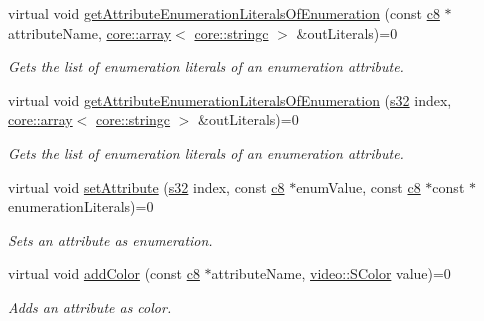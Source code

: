 \begin{DoxyCompactItemize}
virtual void \hyperlink{classirr_1_1io_1_1IAttributes_a74980af4d5297b74670f55711e25fd79}{get\+Attribute\+Enumeration\+Literals\+Of\+Enumeration} (const \hyperlink{namespaceirr_a9395eaea339bcb546b319e9c96bf7410}{c8} $\ast$attribute\+Name, \hyperlink{classirr_1_1core_1_1array}{core\+::array}$<$ \hyperlink{namespaceirr_1_1core_ab26a0e0359206b5a694f35c37c829d7f}{core\+::stringc} $>$ \&out\+Literals)=0
\begin{DoxyCompactList}\small\item\em Gets the list of enumeration literals of an enumeration attribute. \end{DoxyCompactList}\item 
virtual void \hyperlink{classirr_1_1io_1_1IAttributes_ae5d5d0c42a5a0199baf12abe971cb610}{get\+Attribute\+Enumeration\+Literals\+Of\+Enumeration} (\hyperlink{namespaceirr_ac66849b7a6ed16e30ebede579f9b47c6}{s32} index, \hyperlink{classirr_1_1core_1_1array}{core\+::array}$<$ \hyperlink{namespaceirr_1_1core_ab26a0e0359206b5a694f35c37c829d7f}{core\+::stringc} $>$ \&out\+Literals)=0
\begin{DoxyCompactList}\small\item\em Gets the list of enumeration literals of an enumeration attribute. \end{DoxyCompactList}\item 
\mbox{\label{classirr_1_1io_1_1IAttributes_a90962800fc16f01aa90e88a83188449b}} 
virtual void \hyperlink{classirr_1_1io_1_1IAttributes_a90962800fc16f01aa90e88a83188449b}{set\+Attribute} (\hyperlink{namespaceirr_ac66849b7a6ed16e30ebede579f9b47c6}{s32} index, const \hyperlink{namespaceirr_a9395eaea339bcb546b319e9c96bf7410}{c8} $\ast$enum\+Value, const \hyperlink{namespaceirr_a9395eaea339bcb546b319e9c96bf7410}{c8} $\ast$const $\ast$enumeration\+Literals)=0
\begin{DoxyCompactList}\small\item\em Sets an attribute as enumeration. \end{DoxyCompactList}\item 
\mbox{\label{classirr_1_1io_1_1IAttributes_ac21b8b746405ed42429bc4f2a56d7b93}} 
virtual void \hyperlink{classirr_1_1io_1_1IAttributes_ac21b8b746405ed42429bc4f2a56d7b93}{add\+Color} (const \hyperlink{namespaceirr_a9395eaea339bcb546b319e9c96bf7410}{c8} $\ast$attribute\+Name, \hyperlink{classirr_1_1video_1_1SColor}{video\+::\+S\+Color} value)=0
\begin{DoxyCompactList}\small\item\em Adds an attribute as color. \end{DoxyCompactList}\item 

\end{DoxyCompactItemize}
